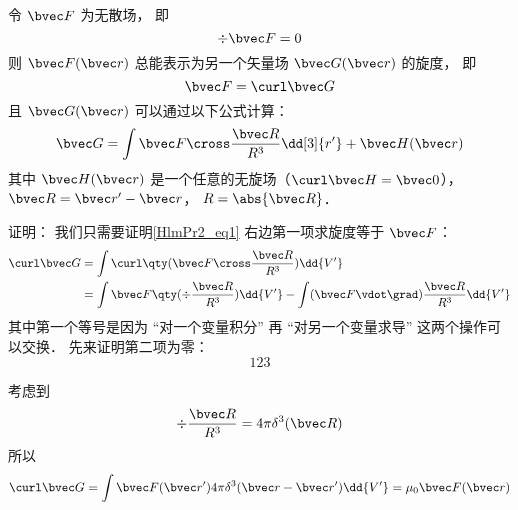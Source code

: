 
\begin{theorem}{}
令 $\bvec F$ 为无散场， 即
\begin{equation}
\div \bvec F = 0
\end{equation}
则 $\bvec F(\bvec r)$ 总能表示为另一个矢量场 $\bvec G(\bvec r)$ 的旋度， 即
\begin{equation}
\bvec F = \curl \bvec G
\end{equation}
且 $\bvec G(\bvec r)$ 可以通过以下公式计算：
\begin{equation}\label{HlmPr2_eq1}
\bvec G = \int \bvec F \cross \frac{\bvec R}{R^3} \dd[3]{r'} + \bvec H(\bvec r)
\end{equation}
其中 $\bvec H(\bvec r)$ 是一个任意的无旋场（$\curl \bvec H = \bvec 0$）， $\bvec R = \bvec r' - \bvec r$， $R = \abs{\bvec R}$．
\end{theorem}

证明： 我们只需要证明\autoref{HlmPr2_eq1} 右边第一项求旋度等于 $\bvec F$：
\begin{equation}
\begin{aligned}
\curl \bvec G &= \int \curl \qty(\bvec F \cross \frac{\bvec R}{R^3}) \dd{V'}\\
&= \int\bvec F \qty(\div \frac{\bvec R}{R^3}) \dd{V'} -  \int(\bvec F \vdot \grad) \frac{\bvec R}{R^3} \dd{V'}
\end{aligned}
\end{equation}
其中第一个等号是因为 “对一个变量积分” 再 “对另一个变量求导” 这两个操作可以交换． %
先来证明第二项为零：
\begin{equation}
123
\end{equation}

考虑到
\begin{equation}
\div \frac{\bvec R}{R^3} = 4\pi \delta^3(\bvec R)
\end{equation}
所以
\begin{equation}
\curl \bvec G = \int \bvec F(\bvec r') 4\pi \delta^3(\bvec r - \bvec r') \dd{V'} = \mu_0 \bvec F(\bvec r)
\end{equation}
